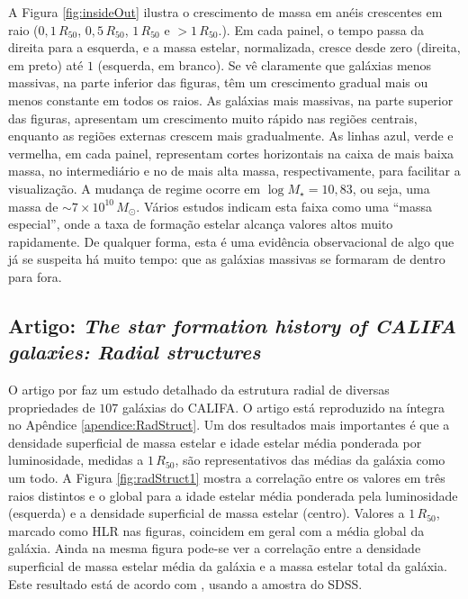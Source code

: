 A Figura \ref{fig:insideOut} ilustra o crescimento de massa em anéis crescentes
em raio ($0,1\,R_{50}$, $0,5\,R_{50}$, $1\,R_{50}$ e $>1\,R_{50}$.). Em cada
painel, o tempo passa da direita para a esquerda, e a massa estelar,
normalizada, cresce desde zero (direita, em preto) até $1$ (esquerda, em
branco). Se vê claramente que galáxias menos massivas, na parte inferior das
figuras, têm um crescimento gradual mais ou menos constante em todos os raios.
As galáxias mais massivas, na parte superior das figuras, apresentam um
crescimento muito rápido nas regiões centrais, enquanto as regiões externas
crescem mais gradualmente. As linhas azul, verde e vermelha, em cada painel,
representam cortes horizontais na caixa de mais baixa massa, no intermediário e
no de mais alta massa, respectivamente, para facilitar a visualização. A mudança
de regime ocorre em $\log M_\star = 10,83$, ou seja, uma massa de $\sim
7\times10^{10}\,M_\odot$. Vários estudos indicam esta faixa como uma ``massa
especial'', onde a taxa de formação estelar alcança valores altos muito
rapidamente. De qualquer forma, esta é uma evidência observacional de algo que
já se suspeita há muito tempo: que as galáxias massivas se formaram de dentro
para fora.




\subsection{Artigo: {\em The star formation history of CALIFA galaxies: Radial
structures}}
\label{sec:pycasso:art:RadStruct}

O artigo por \citet{GonzalezDelgado2014a} faz um estudo detalhado da estrutura
radial de diversas propriedades de $107$ galáxias do CALIFA. O artigo está
reproduzido na íntegra no Apêndice \ref{apendice:RadStruct}.
Um dos resultados mais importantes é que a densidade superficial de massa
estelar e idade estelar média ponderada por luminosidade, medidas a $1\,R_{50}$,
são representativos das médias da galáxia como um todo. A Figura
\ref{fig:radStruct1} mostra a correlação entre os valores em três raios
distintos e o global para a idade estelar média ponderada pela luminosidade
(esquerda) e a densidade superficial de massa estelar (centro). Valores a
$1\,R_{50}$, marcado como HLR nas figuras, coincidem em geral com a média global
da galáxia.
Ainda na mesma figura pode-se ver a correlação entre a densidade superficial de
massa estelar média da galáxia e a massa estelar total da galáxia. Este
resultado está de acordo com \citet{Kauffmann2003}, usando a amostra do SDSS.

